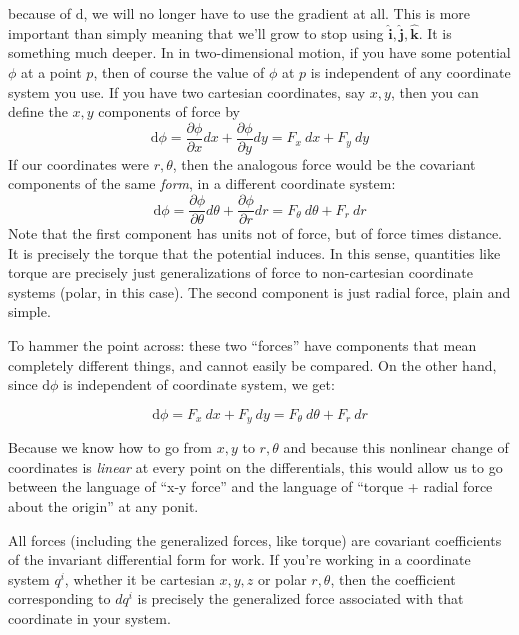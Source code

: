 	because of $\mathrm d$, we will no longer have to use the gradient at all. This is more important than simply meaning that we'll grow to stop using $\mathbf{\hat i}, \mathbf{\hat j},\mathbf{\hat k}$. It is something much deeper. In in two-dimensional motion, if you have some potential $\phi$ at a point $p$, then of course the value of $\phi$ at $p$ is independent of any coordinate system you use. If you have two cartesian coordinates, say $x,y$, then you can define the $x,y$ components of force by 
	\begin{equation*}
		\mathrm d \phi= \frac{\partial \phi}{\partial x} dx + \frac{\partial \phi}{\partial y} dy= F_x ~ dx + F_y ~dy 
	\end{equation*}
	If our coordinates were $r,\theta$, then the analogous force would be the covariant components of the same \emph{form}, in a different coordinate system:
	\begin{equation*}
		\mathrm d \phi = \frac{\partial \phi}{\partial \theta} d\theta + \frac{\partial \phi}{\partial r} dr = F_\theta ~ d\theta + F_r ~ dr
	\end{equation*}
	Note that the first component has units not of force, but of force times distance. It is precisely the torque that the potential induces. In this sense, quantities like torque are precisely just generalizations of force to non-cartesian coordinate systems (polar, in this case). The second component is just radial force, plain and simple.
	
	To hammer the point across: these two ``forces'' have components that mean completely different things, and cannot easily be compared. On the other hand, since $\mathrm d \phi$ is independent of coordinate system, we get:
	
	\begin{equation}
		\mathrm d \phi = F_x ~ dx + F_y ~ dy = F_\theta ~ d\theta + F_r ~ dr 
	\end{equation}
	
	Because we know how to go from $x,y$ to $r, \theta$ and because this nonlinear change of coordinates is \emph{linear} at every point on the differentials, this would allow us to go between the language of ``x-y force'' and the language of ``torque + radial force about the origin''  at any ponit.
	
	All forces (including the generalized forces, like torque) are covariant coefficients of the invariant differential form for work. If you're working in a coordinate system $q^i$, whether it be cartesian $x,y,z$ or polar $r, \theta$, then the coefficient corresponding to $dq^i$ is precisely the generalized force associated with that coordinate in your system.\\
	
